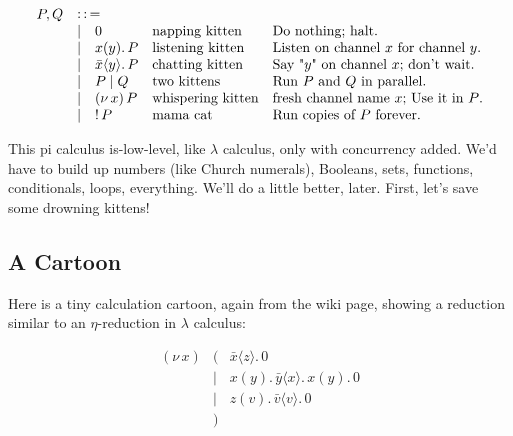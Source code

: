 \documentclass[10pt,oneside,x11names]{article}
\newcommand{\Coloneqq}{\mathrel{\vcenter{\hbox{$:\,:\,=$}}{}}}
\newcommand\napping    [0]{0}
\newcommand\chatting   [3]{\bar{#1}\langle{#2}\rangle{}.\,#3}
\newcommand\listening  [3]{#1(#2).\,#3}
\newcommand\two        [2]{#1\mathrel{\vert}{#2}}
\newcommand\whispering [2]{(\nu\,#1)\,{#2}}
\newcommand\mama       [1]{!\,{#1}}
\newcommand{\kitOne}{\chatting{x}{z}{\napping}}
\newcommand{\kitTwo}{\listening{x}{y}{\chatting{y}{x}{\listening{x}{y}{\napping}}}}
\newcommand{\kitThree}{\listening{z}{v}{\chatting{v}{v}{\napping}}}
\theoremstyle{definition}
\theoremstyle{warning}
\begin{document}
\begin{equation}
\begin{array}{clll}
  P, Q & \Coloneqq \\
       & | \quad \napping            & \textrm{napping kitten}    & \textrm{Do nothing; halt.}                                    \\
       & | \quad \listening{x}{y}{P} & \textrm{listening kitten}  & \textrm{Listen on channel }x\textrm{ for channel }y\textrm{.} \\
       & | \quad \chatting{x}{y}{P}  & \textrm{chatting kitten}   & \textrm{Say "}y\textrm{" on channel }x\textrm{; don't wait.}  \\
       & | \quad \two{P}{Q}          & \textrm{two kittens}       & \textrm{Run }P\textrm{ and }Q\textrm{ in parallel.}           \\
       & | \quad \whispering{x}{P}   & \textrm{whispering kitten} & \textrm{fresh channel name }x\textrm{; Use it in }P\textrm{.} \\
       & | \quad \mama{P}            & \textrm{mama cat}          & \textrm{Run copies of }P\textrm{ forever.} \\
\end{array}
\end{equation}

This pi calculus is-low-level, like \(\lambda\) calculus, only with
concurrency added. We'd have to build up numbers (like Church
numerals), Booleans, sets, functions, conditionals, loops,
everything. We'll do a little better, later. First, let's save
some drowning kittens!

\subsection{A Cartoon}
\label{sec:org20053f3}

Here is a tiny calculation cartoon, again from the wiki page,
showing a reduction similar to an \(\eta\)\nobreakdash-reduction in
\(\lambda\) calculus:

\begin{equation}
\begin{array}{clll}
  (\nu\,x) & (      & \kitOne \\
           & \vert  & \kitTwo \\
           & \vert  & \kitThree \\
       {}  & )
\end{array}
\end{equation}
\end{document}
